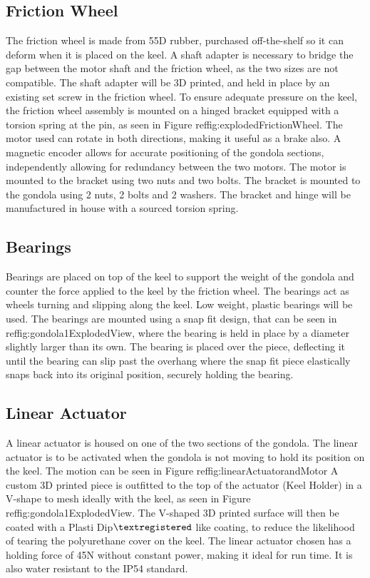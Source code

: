 \documentclass[../main.tex]{subfiles}
\begin{document}
\subsection{Friction Wheel}
The friction wheel is made from 55D rubber, purchased off-the-shelf so it can deform when it is placed on the keel. A shaft adapter is necessary to bridge the gap between the motor shaft and the friction wheel, as the two sizes are not compatible. The shaft adapter will be 3D printed, and held in place by an existing set screw in the friction wheel. To ensure adequate pressure on the keel, the friction wheel assembly is mounted on a hinged bracket equipped with a torsion spring at the pin, as seen in Figure ref{fig:explodedFrictionWheel}. The motor used can rotate in both directions, making it useful as a brake also. A magnetic encoder allows for accurate positioning of the gondola sections, independently allowing for redundancy between the two motors. The motor is mounted to the bracket using two nuts and two bolts. The bracket is mounted to the gondola using 2 nuts, 2 bolts and 2 washers. The bracket and hinge will be manufactured in house with a sourced torsion spring.
\\
\subsection{Bearings}
Bearings are placed on top of the keel to support the weight of the gondola and counter the force applied to the keel by the friction wheel. The bearings act as wheels turning and slipping along the keel. Low weight, plastic bearings will be used. The bearings are mounted using a snap fit design, that can be seen in ref{fig:gondola1ExplodedView}, where the bearing is held in place by a diameter slightly larger than its own. The bearing is placed over the piece, deflecting it until the bearing can slip past the overhang where the snap fit piece elastically snaps back into its original position, securely holding the bearing.
\\
\subsection{Linear Actuator}
A linear actuator is housed on one of the two sections of the gondola. The linear actuator is to be activated when the gondola is not moving to hold its position on the keel. The motion can be seen in Figure ref{fig:linearActuatorandMotor} A custom 3D printed piece is outfitted to the top of the actuator (Keel Holder) in a V-shape to mesh ideally with the keel, as seen in Figure ref{fig:gondola1ExplodedView}. The V-shaped 3D printed surface will then be coated with a Plasti Dip${\textregistered}$ like coating, to reduce the likelihood of tearing the polyurethane cover on the keel.  The  linear actuator chosen has a holding force of 45N without constant power, making it ideal for run time. It is also water resistant to the IP54 standard. 
\\
\end{document}
